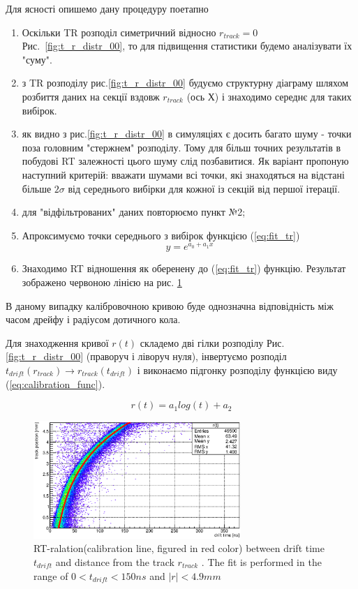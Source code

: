 \documentclass[]{article}
\begin{document}
	Для ясності опишемо дану процедуру поетапно
	\begin{enumerate}
	\item Оскільки TR розподіл симетричний відносно $r_{track} =0$ Рис.~\ref{fig:t_r_distr_00}, то для підвищення статистики будемо аналізувати їх "суму".
	\item з TR розподілу рис.\ref{fig:t_r_distr_00} будуємо структурну діаграму шляхом розбиття даних на секції вздовж $r_{track}$ (ось Х) і знаходимо середнє для таких вибірок.
	\item як видно з рис.\ref{fig:t_r_distr_00} в симуляціях є досить багато шуму - точки поза головним "стержнем" розподілу. Тому для більш точних результатів в побудові RT залежності цього шуму слід позбавитися. Як варіант пропоную наступний критерій: вважати шумами всі точки, які знаходяться на відстані більше $2 \sigma $ від середнього вибірки для кожної із секцій від першої ітерації.
	\item для "відфільтрованих" даних повторюємо пункт №2;
	\item Апроксимуємо точки середнього з вибірок функцією (\ref{eq:fit_tr})
	\begin{equation}
		y = e^{a_0 +a_1x}
		\label{eq:fit_tr}
	\end{equation}
	\item Знаходимо RT відношення як оберенену до (\ref{eq:fit_tr})  функцію. Результат зображено червоною лінією на рис. \ref{fig:calibration_00}
	\end{enumerate}
	
	
	В даному випадку калібровочною кривою буде однозначна відповідність між часом дрейфу і радіусом дотичного кола.
	
	Для знаходження кривої $r(t)$ складемо дві гілки розподілу Рис. \ref{fig:t_r_distr_00} (праворуч і ліворуч нуля),	
	 інвертуємо розподіл $t_{drift}(r_{track}) \longrightarrow r_{track}(t_{drift})$ і виконаємо підгонку розподілу функцією виду (\ref{eq:calibration_func}).
	
	\begin{equation}
		\label{eq:calibration_func}
		r(t) = a_1 log(t) + a_2
	\end{equation}
	
	\begin{figure}[h]
	\includegraphics[width=0.7\textwidth]{rt_calibration.eps}
	\centering
	\caption{ RT-ralation(calibration line, figured in red color) between drift time $t_{drift}$ and distance from the  track $r_{track}$ .  The fit is performed in the range of
$0 < t_{drift} < 150 ns$ and $|r| < 4.9mm$ }
	\label{fig:calibration_00}
	\end{figure}
	
\end{document}
